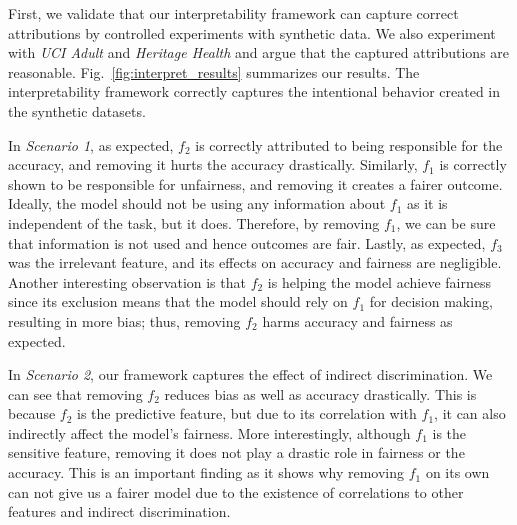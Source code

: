 

First, we validate that our interpretability framework can capture correct attributions by controlled experiments with synthetic data. We also experiment with \textit{UCI Adult} and \textit{Heritage Health} and argue that the captured attributions are reasonable. Fig.~\ref{fig:interpret_results} summarizes our results. The interpretability framework correctly captures the intentional behavior created in the synthetic datasets.

In \textit{Scenario 1}, as expected, $f_2$ is correctly attributed to being responsible for the accuracy, and removing it hurts the accuracy drastically. Similarly, $f_1$ is correctly shown to be responsible for unfairness, and removing it creates a fairer outcome. Ideally, the model should not be using any information about $f_1$ as it is independent of the task, but it does. Therefore, by removing $f_1$, we can be sure that information is not used and hence outcomes are fair. Lastly, as expected, $f_3$ was the irrelevant feature, and its effects on accuracy and fairness are negligible. Another interesting observation is that $f_2$ is helping the model achieve fairness since its exclusion means that the model should rely on $f_1$ for decision making, resulting in more bias; thus, removing $f_2$ harms accuracy and fairness as expected.

In \textit{Scenario 2}, our framework captures the effect of indirect discrimination. We can see that removing $f_2$  reduces bias as well as accuracy drastically. This is because $f_2$ is the predictive feature, but due to its correlation with $f_1$, it can also indirectly affect the model's fairness. More interestingly, although $f_1$ is the sensitive feature, removing it does not play a drastic role in fairness or the accuracy. This is an important finding as it shows why removing $f_1$ on its own can not give us a fairer model due to the existence of correlations to other features and indirect discrimination. 

